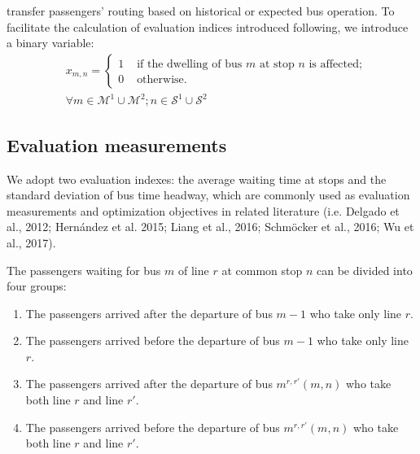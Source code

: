 \documentclass[smallextended]{svjour3}       %
\begin{document}
\begin{Abstract}
transfer passengers' routing based on historical or expected bus operation.
To facilitate the calculation of evaluation indices introduced following, 
we introduce a binary variable: 
\begin{equation}
    \begin{split}
        &x_{m,n}=
        \begin{cases}
            1&\text{ if the dwelling of bus } m \text{ at stop } n \text{ is affected;}\\
            0&\text{ otherwise.}
        \end{cases}\\
        &\forall m \in \mathcal{M}^{1}\cup\mathcal{M}^{2}; n \in \mathcal{S}^{1}\cup\mathcal{S}^{2}        
    \end{split}
\end{equation}
\subsection{Evaluation measurements}
We adopt two evaluation indexes: 
the average waiting time at stops and the standard deviation of bus time headway, which are commonly used 
as evaluation measurements and optimization objectives in related literature (i.e. Delgado et al., 2012; Hernández et al. 2015; Liang et al., 2016; Schmöcker et al., 2016; Wu et al., 2017).

The passengers waiting for bus $m$ of line $r$ at common stop $n$ can be divided into four groups:
\begin{enumerate}[1)]
    \item The passengers arrived after the departure of bus $m-1$ who take only line $r$.
    \item The passengers arrived before the departure of bus $m-1$ who take only line $r$.
    \item The passengers arrived after the departure of bus $m^{r,r'}(m,n)$ who take both line $r$ and line $r'$.
    \item The passengers arrived before the departure of bus $m^{r,r'}(m,n)$ who take both line $r$ and line $r'$.
\end{enumerate} 


\end{Abstract}
\end{document}
